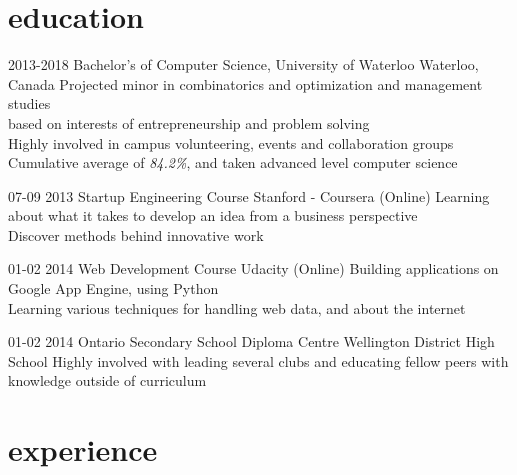 \documentclass[]{friggeri-cv}
\newcommand{\imp}[1] {{\em #1}}
\begin{document}
\section{education}

\begin{entrylist}
  \entry
    {2013-2018}
    {Bachelor's of Computer Science, University of Waterloo}
    {Waterloo, Canada}
	{Projected minor in combinatorics and optimization and management studies \\
	\hspace*{4mm}based on interests of entrepreneurship and problem solving \\
	Highly involved in campus volunteering, events and collaboration groups \\ Cumulative average of \imp{84.2\%}, and taken advanced level computer science}
	
  \entry
  	{07-09 2013}
  	{Startup Engineering Course}
  	{Stanford - Coursera (Online)}
  	{Learning about what it takes to develop an idea from a business perspective \\
  	Discover methods behind innovative work}
  	
  \entry
  	{01-02 2014}
  	{Web Development Course}
  	{Udacity (Online)}
  	{Building applications on Google App Engine, using Python \\
  	Learning various techniques for handling web data, and about the internet}
  	
  \entry
  	{01-02 2014}
  	{Ontario Secondary School Diploma}
  	{Centre Wellington District High School}
    {Highly involved with leading several clubs and educating fellow peers with knowledge outside of curriculum \\
    }
\end{entrylist}

\section{experience}
\end{document}
